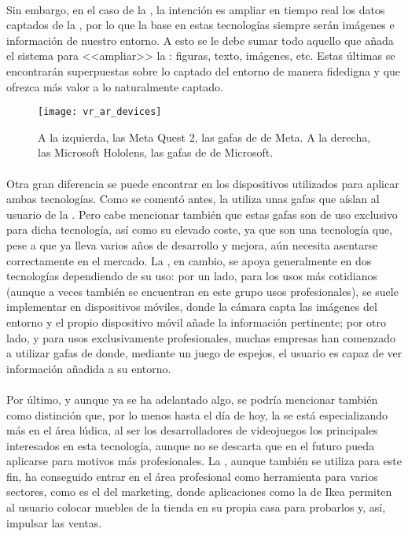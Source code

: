 \documentclass{subfiles}
\begin{document}
        \paragraph{}
        Sin embargo, en el caso de la \ra, la intención es ampliar en tiempo real los datos captados de la \realidad, por lo que la base en estas tecnologías siempre serán imágenes e información de nuestro entorno. A esto se le debe sumar todo aquello que añada el sistema para <<ampliar>> la \realidad: figuras, texto, imágenes, etc. Estas últimas se encontrarán superpuestas sobre lo captado del entorno de manera fidedigna y que ofrezca más valor a lo naturalmente captado.

        \begin{figure}
        \centering
        \texttt{[image: vr\_ar\_devices]}
        \caption{A la izquierda, las Meta Quest 2, las gafas de \rv de Meta. A la derecha, las Microsoft Hololens, las gafas de \ra de Microsoft.}
        \label{fig:vr_ar_devices}
        \end{figure}
    
        \paragraph{}
        Otra gran diferencia se puede encontrar en los dispositivos utilizados para aplicar ambas tecnologías. Como se comentó antes, la \rv utiliza unas gafas que aíslan al usuario de la \realidad. Pero cabe mencionar también que estas gafas son de uso exclusivo para dicha tecnología, así como su elevado coste, ya que son una tecnología que, pese a que ya lleva varios años de desarrollo y mejora, aún necesita asentarse correctamente en el mercado. La \ra, en cambio, se apoya generalmente en dos tecnologías dependiendo de su uso: por un lado, para los usos más cotidianos (aunque a veces también se encuentran en este grupo usos profesionales), se suele implementar en dispositivos móviles, donde la cámara capta las imágenes del entorno y el propio dispositivo móvil añade la información pertinente; por otro lado, y para usos exclusivamente profesionales, muchas empresas han comenzado a utilizar gafas de \ra donde, mediante un juego de espejos, el usuario es capaz de ver información añadida a su entorno.

        \paragraph{}
        Por último, y aunque ya se ha adelantado algo, se podría mencionar también como distinción que, por lo menos hasta el día de hoy, la \rv se está especializando más en el área lúdica, al ser los desarrolladores de videojuegos los principales interesados en esta tecnología, aunque no se descarta que en el futuro pueda aplicarse para motivos más profesionales. La \ra, aunque también se utiliza para este fin, ha conseguido entrar en el área profesional como herramienta para varios sectores, como es el del marketing, donde aplicaciones como la de Ikea permiten al usuario colocar muebles de la tienda en su propia casa para probarlos y, así, impulsar las ventas.
        
\end{document}
